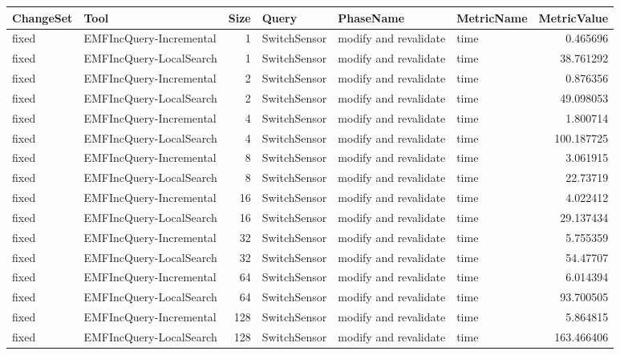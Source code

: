 \begin{table}
\centering
\footnotesize
\begin{tabular}{| l | l | r | l | l | l | r |}
\hline
\sf ChangeSet & \sf Tool & \sf Size & \sf Query & \sf PhaseName & \sf MetricName & \sf MetricValue\\\hline


fixed & EMFIncQuery-Incremental & 1 & SwitchSensor & modify and revalidate & time & 0.465696\\\hline
fixed & EMFIncQuery-LocalSearch & 1 & SwitchSensor & modify and revalidate & time & 38.761292\\\hline
fixed & EMFIncQuery-Incremental & 2 & SwitchSensor & modify and revalidate & time & 0.876356\\\hline
fixed & EMFIncQuery-LocalSearch & 2 & SwitchSensor & modify and revalidate & time & 49.098053\\\hline
fixed & EMFIncQuery-Incremental & 4 & SwitchSensor & modify and revalidate & time & 1.800714\\\hline
fixed & EMFIncQuery-LocalSearch & 4 & SwitchSensor & modify and revalidate & time & 100.187725\\\hline
fixed & EMFIncQuery-Incremental & 8 & SwitchSensor & modify and revalidate & time & 3.061915\\\hline
fixed & EMFIncQuery-LocalSearch & 8 & SwitchSensor & modify and revalidate & time & 22.73719\\\hline
fixed & EMFIncQuery-Incremental & 16 & SwitchSensor & modify and revalidate & time & 4.022412\\\hline
fixed & EMFIncQuery-LocalSearch & 16 & SwitchSensor & modify and revalidate & time & 29.137434\\\hline
fixed & EMFIncQuery-Incremental & 32 & SwitchSensor & modify and revalidate & time & 5.755359\\\hline
fixed & EMFIncQuery-LocalSearch & 32 & SwitchSensor & modify and revalidate & time & 54.47707\\\hline
fixed & EMFIncQuery-Incremental & 64 & SwitchSensor & modify and revalidate & time & 6.014394\\\hline
fixed & EMFIncQuery-LocalSearch & 64 & SwitchSensor & modify and revalidate & time & 93.700505\\\hline
fixed & EMFIncQuery-Incremental & 128 & SwitchSensor & modify and revalidate & time & 5.864815\\\hline
fixed & EMFIncQuery-LocalSearch & 128 & SwitchSensor & modify and revalidate & time & 163.466406\\\hline

\end{tabular}
\end{table}
